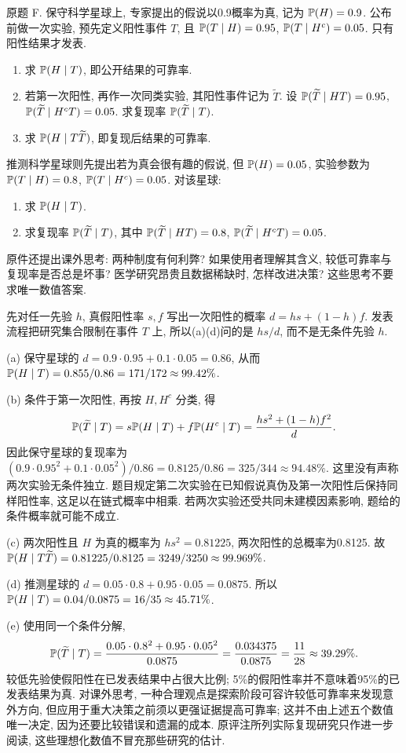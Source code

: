 \begin{exercise}\label{ps3-f}
原题 F. 保守科学星球上, 专家提出的假说以0.9概率为真, 记为 $\mathbb P(H)=0.9$. 公布前做一次实验, 预先定义阳性事件 $T$, 且 $\mathbb P(T\mid H)=0.95$, $\mathbb P(T\mid H^c)=0.05$. 只有阳性结果才发表.
\begin{enumerate}[label=(\alph*)]
\item 求 $\mathbb P(H\mid T)$, 即公开结果的可靠率.
\item 若第一次阳性, 再作一次同类实验, 其阳性事件记为 $\widetilde T$. 设 $\mathbb P(\widetilde T\mid H T)=0.95$, $\mathbb P(\widetilde T\mid H^c T)=0.05$. 求复现率 $\mathbb P(\widetilde T\mid T)$.
\item 求 $\mathbb P(H\mid T\widetilde T)$, 即复现后结果的可靠率.
\end{enumerate}
推测科学星球则先提出若为真会很有趣的假说, 但 $\mathbb P(H)=0.05$, 实验参数为 $\mathbb P(T\mid H)=0.8$, $\mathbb P(T\mid H^c)=0.05$. 对该星球:
\begin{enumerate}[label=(\alph*),start=4]
\item 求 $\mathbb P(H\mid T)$.
\item 求复现率 $\mathbb P(\widetilde T\mid T)$, 其中 $\mathbb P(\widetilde T\mid HT)=0.8$, $\mathbb P(\widetilde T\mid H^cT)=0.05$.
\end{enumerate}
原件还提出课外思考: 两种制度有何利弊? 如果使用者理解其含义, 较低可靠率与复现率是否总是坏事? 医学研究昂贵且数据稀缺时, 怎样改进决策? 这些思考不要求唯一数值答案.
\end{exercise}
\begin{solution}
先对任一先验 $h$, 真假阳性率 $s,f$ 写出一次阳性的概率
$d=hs+(1-h)f$. 发表流程把研究集合限制在事件 $T$ 上, 所以(a)(d)问的是 $hs/d$, 而不是无条件先验 $h$.

(a) 保守星球的 $d=0.9\cdot0.95+0.1\cdot0.05=0.86$, 从而
$\mathbb P(H\mid T)=0.855/0.86=171/172\approx99.42\%$.

(b) 条件于第一次阳性, 再按 $H,H^c$ 分类, 得
\[
\mathbb P(\widetilde T\mid T)=s\mathbb P(H\mid T)+f\mathbb P(H^c\mid T)
=\frac{hs^2+(1-h)f^2}{d}.
\]
因此保守星球的复现率为
$(0.9\cdot0.95^2+0.1\cdot0.05^2)/0.86
=0.8125/0.86=325/344\approx94.48\%$.
这里没有声称两次实验无条件独立. 题目规定第二次实验在已知假说真伪及第一次阳性后保持同样阳性率, 这足以在链式概率中相乘. 若两次实验还受共同未建模因素影响, 题给的条件概率就可能不成立.

(c) 两次阳性且 $H$ 为真的概率为 $hs^2=0.81225$, 两次阳性的总概率为0.8125. 故
$\mathbb P(H\mid T\widetilde T)=0.81225/0.8125=3249/3250\approx99.969\%$.

(d) 推测星球的 $d=0.05\cdot0.8+0.95\cdot0.05=0.0875$. 所以
$\mathbb P(H\mid T)=0.04/0.0875=16/35\approx45.71\%$.

(e) 使用同一个条件分解,
\[
\mathbb P(\widetilde T\mid T)
=\frac{0.05\cdot0.8^2+0.95\cdot0.05^2}{0.0875}
=\frac{0.034375}{0.0875}=\frac{11}{28}\approx39.29\%.
\]
较低先验使假阳性在已发表结果中占很大比例; 5\%的假阳性率并不意味着95\%的已发表结果为真. 对课外思考, 一种合理观点是探索阶段可容许较低可靠率来发现意外方向, 但应用于重大决策之前须以更强证据提高可靠率; 这并不由上述五个数值唯一决定, 因为还要比较错误和遗漏的成本. 原评注所列实际复现研究只作进一步阅读, 这些理想化数值不冒充那些研究的估计.
\end{solution}

